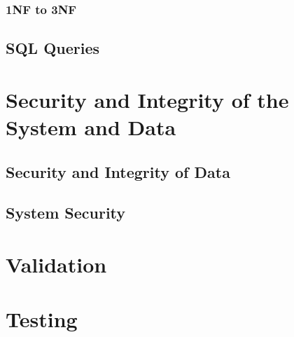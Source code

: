 \subsubsection{1NF to 3NF}

\subsection{SQL Queries}

\section{Security and Integrity of the System and Data}

\subsection{Security and Integrity of Data}

\subsection{System Security}

\section{Validation}

\section{Testing}

